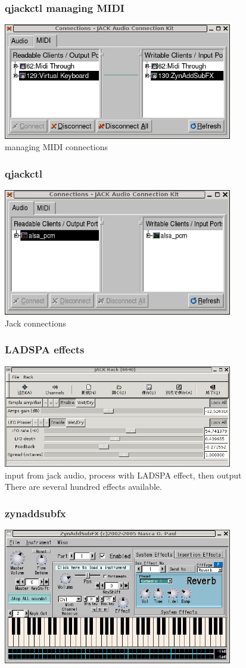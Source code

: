 \documentclass[dvipdfm]{beamer}
\begin{document}
\begin{frame}
 \frametitle{qjackctl managing MIDI}
 \includegraphics[width=10cm]{image200602/qjackctl-midi.png}\\
managing MIDI connections
\end{frame}

\begin{frame}
 \frametitle{qjackctl}
\includegraphics[width=10cm]{image200602/qjackctl-2.png}\\
 Jack connections
\end{frame}

\begin{frame}
 \frametitle{LADSPA effects}
\includegraphics[width=10cm]{image200602/jack-rack.png}\\
input from jack audio, process with LADSPA effect, then output\\
There are several hundred effects available.
\end{frame}

\begin{frame}
 \frametitle{zynaddsubfx}
\includegraphics[width=10cm]{image200602/zynaddsubfx.png}
\end{frame}
\end{document}
